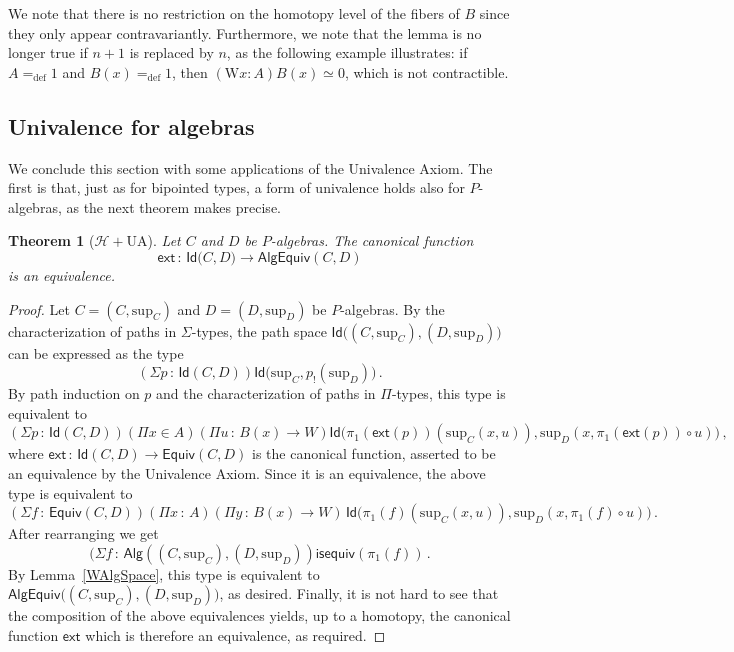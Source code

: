 \documentclass[10pt,a4paper,oneside,reqno]{amsart}
\numberwithin{equation}{section}
\theoremstyle{mythm}
\newtheorem{theorem}{Theorem}[subsection]
\theoremstyle{mydef}
\theoremstyle{myrmk}
\newcommand{\defeq}{=_{\mathrm{def}}}
\newcommand{\co}{\,{:}\,}
\newcommand{\Hint}{\mathcal{H}}
\newcommand{\UA}{\mathrm{UA}}
\newcommand{\isequiv}{\mathsf{isequiv}}
\newcommand{\ext}{\mathsf{ext}}
\newcommand{\Id}{\mathsf{Id}}
\newcommand{\W}{\mathrm{W}}
\newcommand{\Palg}{\mathsf{Alg}}
\renewcommand{\sup}{\mathrm{sup}}
\newcommand{\AlgEquiv}{\mathsf{AlgEquiv}}
\begin{document}
We note that there is no restriction on the homotopy level of the fibers of $B$ since they only appear contravariantly. Furthermore, we note that the lemma is no longer true if $n+1$ is replaced by $n$, as the following example
illustrates: if $A \defeq 1$ and $B(x) \defeq 1$, then $(\W x:A) B(x) \simeq 0$, which is not contractible. 


\subsection{Univalence for algebras} \label{sec:univalencealgebras}
We conclude this section with some applications of the Univalence Axiom. The first is that, just as for bipointed 
types, a form of univalence holds also for $P$-algebras, as the next theorem makes precise. 


\begin{theorem}[$\Hint + \UA$] \label{thm:Punivalence}
Let $C$ and $D$ be $P$-algebras. The canonical function
\[ 
\ext \co \Id \big(C,D\big) \to  \AlgEquiv(C,D) 
\]
is an equivalence.
\end{theorem}

\begin{proof} 
Let $C = (C,\sup_C)$ and $D= (D,\sup_D)$ be $P$-algebras. By the characterization of paths in $\Sigma$-types, the path space 
$\Id \big( (C,\sup_C) ,  (D,\sup_D) \big)$ can be expressed as the type
\[
(\Sigma p \co \Id(C, D)) \Id \big( \sup_C ,  p_{!}(\sup_D)  \big) \, .
\]
By path induction on $p$ and the characterization of paths in $\Pi$-types, this type is equivalent to
\[  
(\Sigma p \co \Id(C,D))
(\Pi x \in A) 
(\Pi u \co B(x) \to W)
\Id \big(  \pi_1(\ext(p))( \sup_C(x,u)),  \sup_D(x, \pi_1(\ext (p)) \circ u) \big) \, , 
\]
where $\ext \co \Id(C,D) \to \mathsf{Equiv}(C,D)$ is the canonical function, asserted to be an equivalence by the Univalence Axiom. Since it is an equivalence, the above type is equivalent to
\[
(\Sigma f \co \mathsf{Equiv}(C,D)) 
(\Pi x  \co A) 
(\Pi y \co B(x) \to W) \, 
\Id \big( \pi_1(f) (\sup_C(x,u))  , \sup_D (x, \pi_1(f) \circ u) \big) \, .
\]
After rearranging we get
\[
(\Sigma f \co \Palg ( (C,\sup_C),  (D,\sup_D) ) \isequiv(\pi_1(f)) \, .
\]
By Lemma~\ref{WAlgSpace}, this type is equivalent to $\AlgEquiv \big( (C,\sup_C),  (D,\sup_D)\big)$, as desired. Finally, it is not hard to see that the composition of the above equivalences yields, up to a homotopy, the canonical function $\ext$ which is therefore an equivalence, as required.
\end{proof} 
\end{document}
